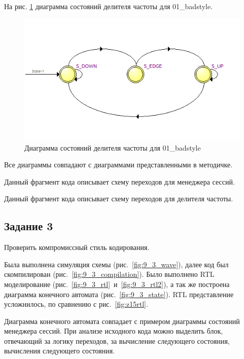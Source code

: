 \documentclass[a4paper,14pt]{article}
\begin{document}
	На рис. \ref{fig:z15autoclkdivider} диаграмма состояний делителя частоты для 01\_badstyle.
	
	\begin{figure}[H]
		\centering
		\includegraphics[width=0.6\linewidth]{images/z1_5_auto_clk_divider}
		\caption{Диаграмма состояний делителя частоты для 01\_badstyle}
		\label{fig:z15autoclkdivider}
	\end{figure}

	Все диаграммы совпадают с диаграммами представленными в методичке.
	
	Данный фрагмент кода описывает схему переходов для менеджера сессий.
	
	{\small {}}

	Данный фрагмент кода описывает схему переходов для делителя частоты.
	
	{\small {}}
	
	\subsection{Задание 3}
	
	Проверить компромиссный стиль кодирования.
	
	Была выполнена симуляция схемы (рис.~\ref{fig:9_3_wave}), далее код был скомпилирован (рис.~\ref{fig:9_3_compilation}).
	Было выполнено RTL моделирование (рис.~\ref{fig:9_3_rtl}~и~\ref{fig:9_3_rtl2}), а так же построена диаграмма конечного автомата (рис.~\ref{fig:9_3_state}).
	RTL представление усложнилось, по сравнению с рис.~\ref{fig:z15rtl}.
	
	Диаграмма конечного автомата совпадает с примером диаграммы состояний менеджера сессий.
	При анализе исходного кода можно выделить блок, отвечающий за логику переходов, за вычисление следующего состояния, вычисления следующего состояния.
	
\end{document}
